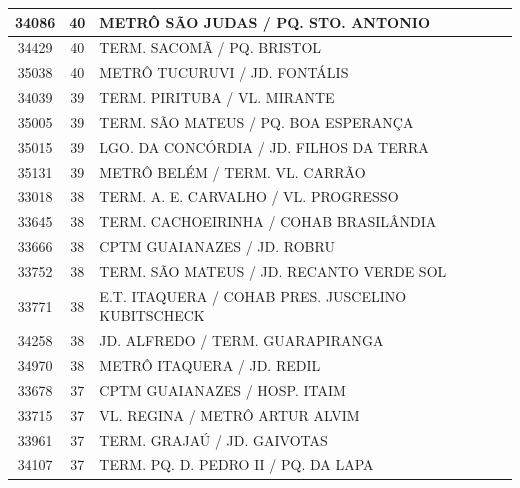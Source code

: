\documentclass[
	12pt,				%
	oneside,			%
	a4paper,			%
	english,			%
	brazil				%
	]{abntex2ppgsi}
\begin{document}
\begin{apendicesenv}
\begin{longtable}{c|c|p{7cm}}
    34086 & 40    & METRÔ SÃO JUDAS / PQ. STO. ANTONIO \\
\hline

    34429 & 40    & TERM. SACOMÃ / PQ. BRISTOL \\
\hline

    35038 & 40    & METRÔ TUCURUVI / JD. FONTÁLIS \\
\hline

    34039 & 39    & TERM. PIRITUBA / VL. MIRANTE \\
\hline

    35005 & 39    & TERM. SÃO MATEUS / PQ. BOA ESPERANÇA \\
\hline

    35015 & 39    & LGO. DA CONCÓRDIA / JD. FILHOS DA TERRA \\
\hline

    35131 & 39    & METRÔ BELÉM / TERM. VL. CARRÃO \\
\hline

    33018 & 38    & TERM. A. E. CARVALHO / VL. PROGRESSO \\
\hline

    33645 & 38    & TERM. CACHOEIRINHA / COHAB BRASILÂNDIA \\
\hline

    33666 & 38    & CPTM GUAIANAZES / JD. ROBRU \\
\hline

    33752 & 38    & TERM. SÃO MATEUS / JD. RECANTO VERDE SOL \\
\hline

    33771 & 38    & E.T. ITAQUERA / COHAB PRES. JUSCELINO KUBITSCHECK \\
\hline

    34258 & 38    & JD. ALFREDO / TERM. GUARAPIRANGA \\
\hline

    34970 & 38    & METRÔ ITAQUERA / JD. REDIL \\
\hline

    33678 & 37    & CPTM GUAIANAZES / HOSP. ITAIM \\
\hline

    33715 & 37    & VL. REGINA / METRÔ ARTUR ALVIM \\
\hline

    33961 & 37    & TERM. GRAJAÚ / JD. GAIVOTAS \\
\hline

    34107 & 37    & TERM. PQ. D. PEDRO II / PQ. DA LAPA \\
\hline


\end{longtable}
\end{apendicesenv}
\end{document}
